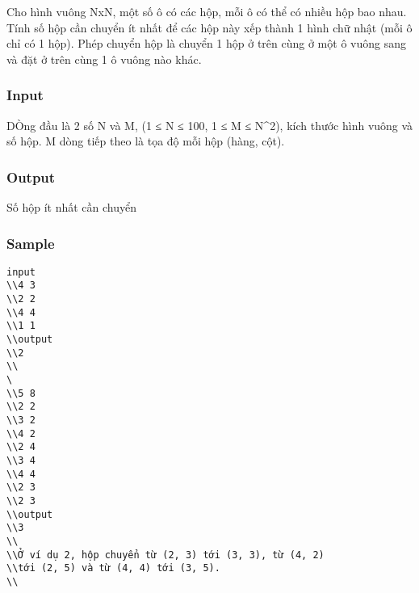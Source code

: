 









   Cho hình vuông NxN, một số ô có các hộp, mỗi ô có thể có nhiều hộp bao nhau. Tính số hộp cần chuyển ít nhất để các hộp này xếp thành 1 hình chữ nhật (mỗi ô chỉ có 1 hộp). Phép chuyển hộp là chuyển 1 hộp ở trên cùng ở một ô vuông sang và đặt ở trên cùng 1 ô vuông nào khác.  



\subsubsection{   Input  }



   DÒng đầu là 2 số N và M,  (1 ≤ N ≤ 100, 1 ≤ M ≤ N\textasciicircum2), kích thước hình vuông và số hộp. M dòng tiếp theo là tọa độ mỗi hộp (hàng, cột).  



\subsubsection{   Output  }



   Số hộp ít nhất cần chuyển  



\subsubsection{   Sample  }
\begin{verbatim}
input
\\4 3
\\2 2
\\4 4
\\1 1
\\output
\\2
\\
\
\\5 8
\\2 2
\\3 2
\\4 2
\\2 4
\\3 4
\\4 4
\\2 3
\\2 3
\\output
\\3
\\
\\Ở ví dụ 2, hộp chuyển từ (2, 3) tới (3, 3), từ (4, 2)
\\tới (2, 5) và từ (4, 4) tới (3, 5).
\\\end{verbatim}

